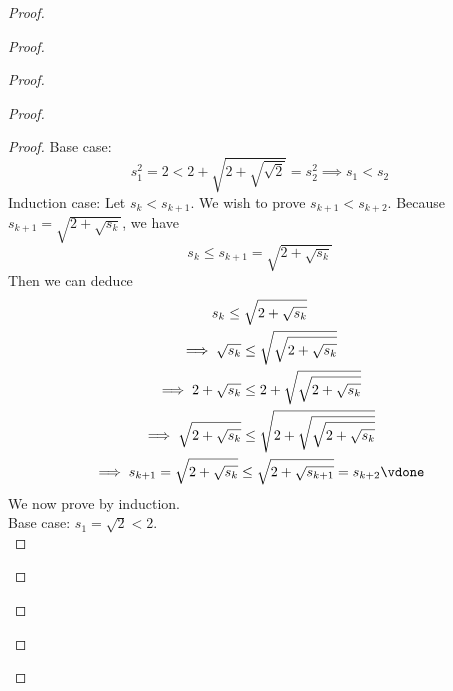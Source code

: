 \documentclass{report}
\begin{document}
\begin{proof}
\begin{proof}
\begin{proof}
\begin{proof}
\begin{proof}
Base case:
\begin{equation*}
s_1^2=2<2+\sqrt{2+\sqrt{\sqrt{2} } }=s_2^2 \implies s_1<s_2
\end{equation*}
Induction case: Let $s_k<s_{k+1}$. We wish to prove $s_{k+1}<s_{k+2}$. Because $s_{k+1}=\sqrt{2+\sqrt{s_k} } $, we have
\begin{equation*}
s_k\leq s_{k+1}=\sqrt{2+\sqrt{s_k} } 
\end{equation*}
Then we can deduce
\begin{gather*}
s_k\leq \sqrt{2+\sqrt{s_k} } \\
\implies \sqrt{s_k}\leq \sqrt{\sqrt{2+\sqrt{s_k} } }\\
\implies 2+\sqrt{s_k}\leq 2+\sqrt{\sqrt{2+\sqrt{s_k} } }\\
\implies \sqrt{2+\sqrt{s_k} }\leq \sqrt{2+\sqrt{\sqrt{2+\sqrt{s_k} } } }\\
\implies s_{k+1}=\sqrt{2+\sqrt{s_k} }\leq \sqrt{2+\sqrt{s_{k+1}} }=s_{k+2}\vdone
\end{gather*}
We now prove  by induction.\\

Base case: $s_1=\sqrt{2}<2$.\\


\end{proof}
\end{proof}
\end{proof}
\end{proof}
\end{proof}
\end{document}
